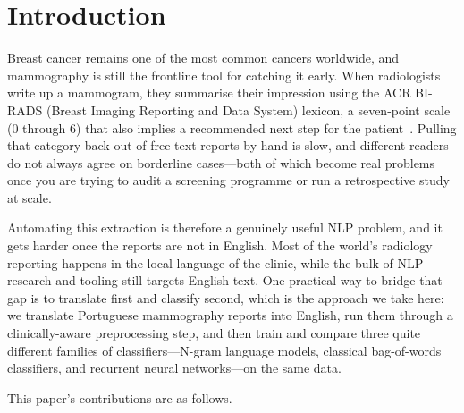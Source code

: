 \documentclass[11pt,a4paper]{article}
\begin{document}
\section{Introduction}

Breast cancer remains one of the most common cancers worldwide, and mammography
is still the frontline tool for catching it early.
When radiologists write up a mammogram, they summarise their impression using
the ACR BI-RADS (Breast Imaging Reporting and Data System) lexicon, a
seven-point scale (0 through 6) that also implies a recommended next step for
the patient~\cite{acr2013}.
Pulling that category back out of free-text reports by hand is slow, and
different readers do not always agree on borderline cases---both of which
become real problems once you are trying to audit a screening programme or run
a retrospective study at scale.

Automating this extraction is therefore a genuinely useful NLP problem, and it
gets harder once the reports are not in English.
Most of the world's radiology reporting happens in the local language of the
clinic, while the bulk of NLP research and tooling still targets English text.
One practical way to bridge that gap is to translate first and classify
second, which is the approach we take here: we translate Portuguese
mammography reports into English, run them through a clinically-aware
preprocessing step, and then train and compare three quite different families
of classifiers---N-gram language models, classical bag-of-words classifiers,
and recurrent neural networks---on the same data.

This paper's contributions are as follows.
\end{document}
